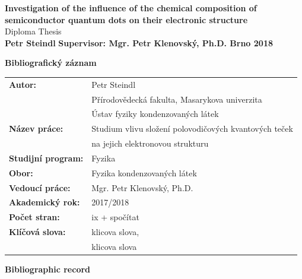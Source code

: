 \documentclass[
a4paper, %
11pt, %
onecolumn, %
openany, %
oldfontcommands,
]{memoir}
\begin{document}
\vspace{5cm}
\begingroup
\noindent \huge{\textbf{Investigation of the influence of the chemical composition of semiconductor quantum dots on their electronic structure}}
\vspace{0.5cm}\\
\Large{Diploma Thesis}
\vspace{0.5cm}\\
\huge{\bfseries{Petr Steindl}}
\vfill
\noindent\normalsize\bfseries{Supervisor: Mgr. Petr Klenovský, Ph.D. \hfill Brno 2018}
\endgroup

\newpage

\Large\textbf{Bibliografický záznam}\\

\normalsize
\renewcommand{\arraystretch}{2}
\begin{tabular}{ll}
	\textbf{Autor:} & Petr Steindl\\[-0.5cm]
	& Přírodovědecká fakulta, Masarykova univerzita\\[-0.5cm]
	& Ústav fyziky kondenzovaných látek\\
	\textbf{Název práce:} & Studium vlivu složení polovodičových kvantových teček \\[-0.5cm]
	& na jejich elektronovou strukturu\\ 
	\textbf{Studijní program:}& Fyzika \\
	\textbf{Obor:}& Fyzika kondenzovaných látek \\
	\textbf{Vedoucí práce:}& Mgr. Petr Klenovský, Ph.D. \\
	\textbf{Akademický rok:}& 2017/2018 \\
	\textbf{Počet stran:}& ix + spočítat \\
	\textbf{Klíčová slova:}& klicova slova, \\[-0.5cm]
	& klicova slova \\
\end{tabular} 


\newpage
\Large\textbf{Bibliographic record}\\
\end{document}
